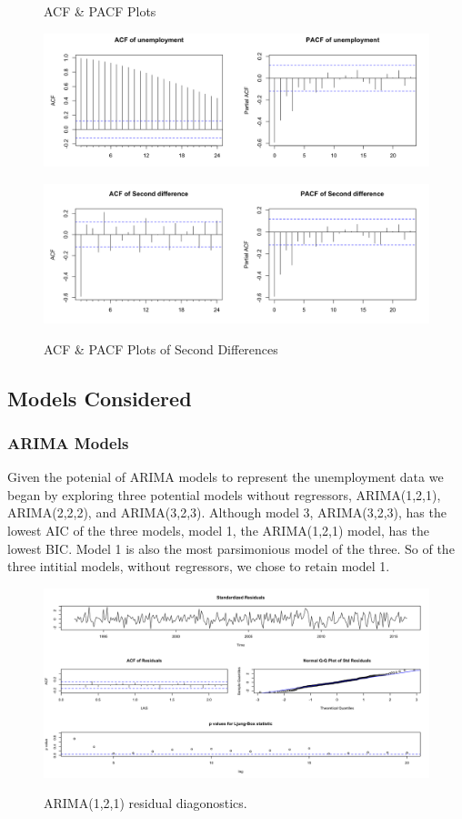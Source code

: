 \documentclass[twoside,twocolumn]{article}
\begin{document}
    \begin{figure}[H]
    	\centering
     	\caption{ACF \& PACF Plots}
     	\includegraphics[width=\linewidth]{images/acfpacf}
     	\label{fig:acfpacf}
     	\caption{ACF \& PACF Plots of Second Differences}
     	\includegraphics[width=\linewidth]{images/acfpacf2d}
     	\label{fig:acfpacf2}
      \end{figure}


\subsection{Models Considered}

\subsubsection{ARIMA Models}

Given the potenial of ARIMA models to represent the unemployment data we began by exploring three potential models without regressors, ARIMA(1,2,1), ARIMA(2,2,2), and ARIMA(3,2,3). Although model 3, ARIMA(3,2,3), has the lowest AIC of the three models, model 1, the ARIMA(1,2,1) model, has the lowest BIC. Model 1 is also the most parsimonious model of the three. So of the three intitial models, without regressors, we chose to retain model 1.  

    \begin{figure}[H]
    	\centering
     	\caption{ARIMA(1,2,1) residual diagonostics.}
     	\includegraphics[width=\linewidth]{images/sarima1}
     	\label{fig:sarimamod1}
     \end{figure}
\end{document}
